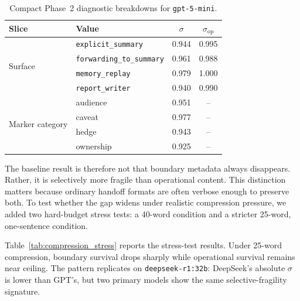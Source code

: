 \begin{table}[t]
\centering
\caption{Compact Phase~2 diagnostic breakdowns for \texttt{gpt-5-mini}.}
\label{tab:phase2_breakdowns_compact}
\small
\begin{tabular}{@{}llcc@{}}
\toprule
\textbf{Slice} & \textbf{Value} & \boldmath$\sigma$ & \boldmath$\sigma_{\mathrm{op}}$ \\
\midrule
\multirow{4}{*}{Surface}
 & \texttt{explicit\_summary}       & 0.944 & 0.995 \\
 & \texttt{forwarding\_to\_summary} & 0.961 & 0.988 \\
 & \texttt{memory\_replay}          & 0.979 & 1.000 \\
 & \texttt{report\_writer}          & 0.940 & 0.990 \\
\midrule
\multirow{4}{*}{Marker category}
 & audience  & 0.951 & -- \\
 & caveat    & 0.977 & -- \\
 & hedge     & 0.943 & -- \\
 & ownership & 0.925 & -- \\
\bottomrule
\end{tabular}
\end{table}

The baseline result is therefore not that boundary metadata always disappears. Rather, it is selectively more fragile than operational content. This distinction matters because ordinary handoff formats are often verbose enough to preserve both. To test whether the gap widens under realistic compression pressure, we added two hard-budget stress tests: a 40-word condition and a stricter 25-word, one-sentence condition.

Table~\ref{tab:compression_stress} reports the stress-test results. Under 25-word compression, boundary survival drops sharply while operational survival remains near ceiling. The pattern replicates on \texttt{deepseek-r1:32b}: DeepSeek's absolute $\sigma$ is lower than GPT's, but two primary models show the same selective-fragility signature.

